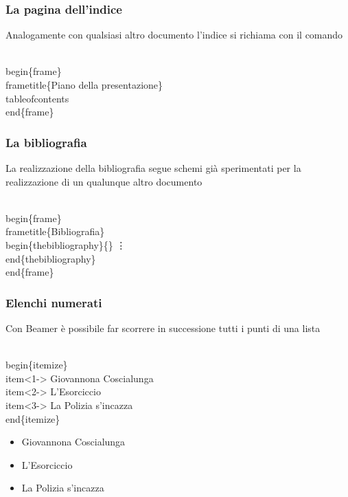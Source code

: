 \documentclass[svgnames,%
	ucs,%
	pdftex]{guitbeamer}
\begin{document}
\begin{frame}
  \frametitle{La pagina dell'indice}
	Analogamente con qualsiasi altro documento l'indice si richiama con il comando  
	\begin{LaTeXcode}
		\\begin\{frame\}\n
		\\frametitle\{Piano della presentazione\}\n
		\hspace*{5ex}\alert{\\tableofcontents}\n
		\\end\{frame\}
	\end{LaTeXcode}
\end{frame}
\begin{frame}
  \frametitle{La bibliografia}
	La realizzazione della bibliografia segue schemi gi\`a sperimentati per la realizzazione di un qualunque altro documento
	\begin{LaTeXcode}
		\\begin\{frame\}\n
		\\frametitle\{Bibliografia\}\n
		\hspace*{5ex}\alert{\\begin\{thebibliography\}\{\}}\n
		\hspace*{15ex} \vdots\n
		\hspace*{5ex}\alert{\\end\{thebibliography\}}\n
		\\end\{frame\}
	\end{LaTeXcode}
\end{frame}
\begin{frame}
  \frametitle{Elenchi numerati}
	Con Beamer \`e possibile far scorrere in successione tutti i punti di una lista
	\begin{LaTeXcode}
		\\begin\{itemize\}\n
		\hspace*{5ex}\\item\alert{<1->} Giovannona Coscialunga\n
		\hspace*{5ex}\\item\alert{<2->} L'Esorciccio\n
		\hspace*{5ex}\\item\alert{<3->} La Polizia s'incazza\n
		\\end\{itemize\}
	\end{LaTeXcode}
	\begin{block}{}
		\begin{itemize}
			\item<3-> Giovannona Coscialunga%
			\item<4-> L'Esorciccio%
			\item<5-> La Polizia s'incazza%
		\end{itemize}
	\end{block}
\end{frame}
\end{document}

